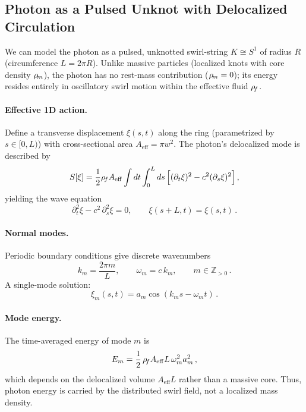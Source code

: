 \documentclass[11pt]{article}
\begin{document}
\subsection{Photon as a Pulsed Unknot with Delocalized Circulation}
\label{sec:photon_pulsed_unknot}
We can model the photon as a pulsed, unknotted swirl-string $K \cong S^1$ of radius $R$ (circumference $L=2\pi R$). Unlike massive particles (localized knots with core density $\rho_{\!m}$), the photon has no rest-mass contribution ($\rho_{\!m}=0$); its energy resides entirely in oscillatory swirl motion within the effective fluid $\rho_{\!f}$.

\paragraph{Effective 1D action.}
    Define a transverse displacement $\xi(s,t)$ along the ring (parametrized by $s\in[0,L)$) with cross-sectional area $A_{\mathrm{eff}}=\pi w^2$. The photon's delocalized mode is described by
    \[
        S[\xi] = \frac{1}{2}\rho_{\!f} A_{\mathrm{eff}} \int dt \int_0^L ds\,\Big[(\partial_t \xi)^2 - c^2 (\partial_s \xi)^2\Big]\,,
    \]
    yielding the wave equation
    \[
        \partial_t^2 \xi - c^2\,\partial_s^2 \xi = 0,\qquad \xi(s+L,t) = \xi(s,t)\,.
    \]

\paragraph{Normal modes.}
    Periodic boundary conditions give discrete wavenumbers
    \[
        k_m = \frac{2\pi m}{L},\qquad \omega_m = c\,k_m,\qquad m\in\mathbb{Z}_{>0}\,.
    \]
    A single-mode solution:
    \[
        \xi_m(s,t) = a_m \cos(k_m s - \omega_m t)\,.
    \]

\paragraph{Mode energy.}
    The time-averaged energy of mode $m$ is
    \[
        E_m = \frac{1}{2}\,\rho_{\!f} A_{\mathrm{eff}} L\,\omega_m^2 a_m^2\,,
    \]
    which depends on the delocalized volume $A_{\mathrm{eff}}L$ rather than a massive core. Thus, photon energy is carried by the distributed swirl field, not a localized mass density.
\end{document}
